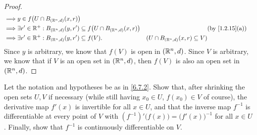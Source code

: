 \begin{proof}
\begin{align*}
    \implies & y \in f\big(U \cap B_{(\R^n, d)}(x, r)\big)                                                                                                                          \\
    \implies & \exists r' \in \R^+ : B_{(\R^n, d)}(y, r') \subseteq f\big(U \cap B_{(\R^n, d)}(x, r)\big) &                                          & \text{(by \cref{1.2.15}(a))} \\
    \implies & \exists r' \in \R^+ : B_{(\R^n, d)}(y, r') \subseteq f(V).                                 & (U \cap B_{(\R^n, d)}(x, r) \subseteq V)
  \end{align*}
  Since \(y\) is arbitrary, we know that \(f(V)\) is open in \((\mathbb{R}^n, d)\).
  Since \(V\) is arbitrary, we know that if \(V\) is an open set in \((\mathbb{R}^n, d)\), then \(f(V)\) is also an open set in \((\mathbb{R}^n, d)\).
\end{proof}

\begin{ex}\label{ex:6.7.4}
  Let the notation and hypotheses be as in \cref{6.7.2}.
  Show that, after shrinking the open sets \(U, V\) if necessary (while still having \(x_0 \in U\), \(f(x_0) \in V\) of course), the derivative map \(f'(x)\) is invertible for all \(x \in U\), and that the inverse map \(f^{-1}\) is differentiable at every point of \(V\) with \((f^{-1})' \big(f(x)\big) = \big(f'(x)\big)^{-1}\) for all \(x \in U\).
  Finally, show that \(f^{-1}\) is continuously differentiable on \(V\).
\end{ex}